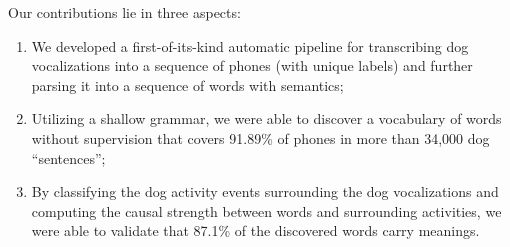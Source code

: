 Our contributions lie in three aspects: 
\begin{enumerate}
\item We developed a first-of-its-kind automatic pipeline for transcribing dog vocalizations 
into a sequence of phones (with unique labels) and further parsing it into a sequence of
words with semantics;
\item Utilizing a shallow grammar, we were able to discover a vocabulary of words 
without supervision that covers 91.89\% of phones in
		more than 34,000 dog ``sentences''; 
\item By classifying the dog activity events surrounding the dog vocalizations and computing 
the causal strength between words and surrounding activities, we were able to 
	validate that 87.1\% of the discovered words carry meanings.
\end{enumerate}
